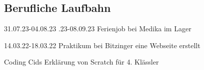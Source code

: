\documentclass[
	10pt, %
]{FreemanCV}
\begin{document}
\begin{paracol}{2}

\section{Berufliche Laufbahn}





\jobentry
{31.07.23-04.08.23	.23-08.09.23} %
{} %
{} %
{Ferienjob} %
{bei Medika im Lager} %


\jobentry
{14.03.22-18.03.22} %
{} %
{} %
{Praktikum} %
{bei Bitzinger eine Webseite erstellt} %


\jobentry
{} %
{} %
{} %
{Coding Cids} %
{Erklärung von Scratch für 4. Klässler} %








\end{paracol}
\end{document}
